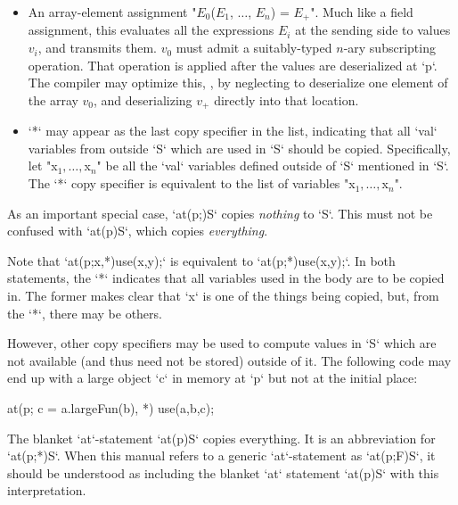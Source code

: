 \begin{itemize}
\item An array-element assignment 
      \xcdmath"$E_0$($E_1$, $\ldots$, $E_n$) = $E_+$".
      Much like a field assignment, this evaluates all the expressions $E_i$
      at the sending side to values $v_i$, and transmits them.  $v_0$ must
      admit a suitably-typed $n$-ary subscripting operation.  That operation
      is applied after the values are deserialized at \xcd`p`.  The compiler
      may optimize this, \eg, by neglecting to deserialize one element of the
      array $v_0$, and deserializing $v_+$ directly into that location.  

\item \xcd`*` may appear as the last copy specifier in the list, indicating
      that all \xcd`val` variables from outside \xcd`S` which are used in
      \xcd`S` should be copied. Specifically, let 
      \xcdmath"x$_1, \ldots, $x$_n$" be all the \xcd`val` variables defined
      outside of \xcd`S` 
      mentioned in \xcd`S`. The \xcd`*` copy specifier is equivalent to 
      the list of variables 
      \xcdmath"x$_1, \ldots, $x$_n$".




\end{itemize}

As an important special case, \xcd`at(p;)S` copies {\em nothing} to \xcd`S`.
This must not be confused with \xcd`at(p)S`, which copies {\em everything}.

Note that \xcd`at(p;x,*)use(x,y);` is equivalent to \xcd`at(p;*)use(x,y);`.
In both statements, the \xcd`*` indicates that all variables used in the body
are to be copied in.  The former makes clear that \xcd`x` is one of the things
being copied, but, from the \xcd`*`, there may be others. 

However, other copy specifiers may be used to compute
values in \xcd`S` which are not available (and thus need not be stored)
outside of it.  The following code may end up with a large object \xcd`c` in
memory at \xcd`p` but not at the initial place: 
\begin{xten}
at(p; c = a.largeFun(b), *) {
  use(a,b,c);
}
\end{xten}


The blanket \xcd`at`-statement \xcd`at(p)S` copies everything.  It is an
abbreviation for \xcd`at(p;*)S`.  
When this manual refers to a generic \xcd`at`-statement as \xcd`at(p;F)S`, it
should be understood as including the blanket \xcd`at` statement \xcd`at(p)S`
with this interpretation.



